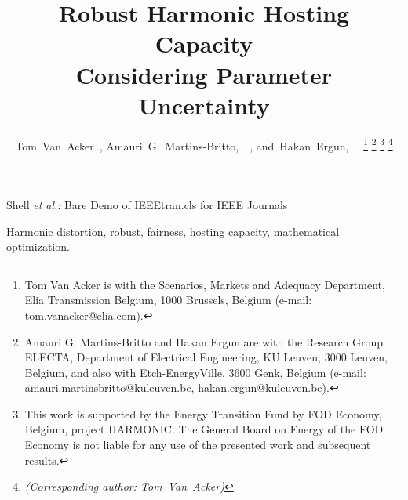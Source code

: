 \documentclass[journal]{IEEEtran}
\begin{document}
\title{Robust Harmonic Hosting Capacity \\ Considering Parameter Uncertainty}
\author{Tom~Van~Acker~, %
        Amauri~G.~Martins-Britto,~~, %
        and~Hakan~Ergun,~~%
\thanks{Tom Van Acker is with the Scenarios, Markets and Adequacy Department, Elia Transmission Belgium, 1000 Brussels, Belgium (e-mail: tom.vanacker@elia.com).}%
\thanks{Amauri G. Martins-Britto and Hakan Ergun are with the Research Group ELECTA, Department of Electrical Engineering, KU Leuven, 3000 Leuven, Belgium, and also with Etch-EnergyVille, 3600 Genk, Belgium (e-mail: amauri.martinsbritto@kuleuven.be, hakan.ergun@kuleuven.be).}
\thanks{This work is supported by the Energy Transition Fund by FOD Economy, Belgium, project HARMONIC. The General Board on Energy of the FOD Economy is not liable for any use of the presented work and subsequent results.}
\thanks{\textit{(Corresponding author: Tom~Van~Acker)}}}

%
{Shell \MakeLowercase{\textit{et al.}}: Bare Demo of IEEEtran.cls for IEEE Journals}

\maketitle

\begin{abstract}
\end{abstract}

\begin{IEEEkeywords}
Harmonic distortion, robust, fairness, hosting capacity, mathematical optimization.
\end{IEEEkeywords}

\IEEEpeerreviewmaketitle



\newpage



\newpage



\newpage



\end{document}
